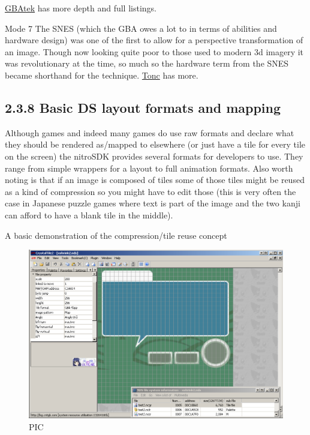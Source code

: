 \documentclass[
]{book}
\begin{document}
\href{http://problemkaputt.de/gbatek.htm\#lcdiocolorspecialeffects}{GBAtek} has more depth and full listings.

Mode 7 The SNES (which the GBA owes a lot to in terms of abilities and hardware design) was one of the first to allow for a perspective transformation of an image. Though now looking quite poor to those used to modern 3d imagery it was revolutionary at the time, so much so the hardware term from the SNES became shorthand for the technique. \href{http://www.coranac.com/tonc/text/mode7.htm}{Tonc} has more.

\hypertarget{basic-ds-layout-formats-and-mapping}{%
\subsection{2.3.8 Basic DS layout formats and mapping}\label{basic-ds-layout-formats-and-mapping}}

Although games and indeed many games do use raw formats and declare what they should be rendered as/mapped to elsewhere (or just have a tile for every tile on the screen) the nitroSDK provides several formats for developers to use. They range from simple wrappers for a layout to full animation formats. Also worth noting is that if an image is composed of tiles some of those tiles might be reused as a kind of compression so you might have to edit those (this is very often the case in Japanese puzzle games where text is part of the image and the two kanji can afford to have a blank tile in the middle).

A basic demonstration of the compression/tile reuse concept

\begin{figure}
\centering
\includegraphics{images/54_home_fast6191_romhackingguide_unrenamed_file___ginal_borders_3wizardozndsdemohack13jul2011.png}
\caption{PIC}
\end{figure}
\end{document}
